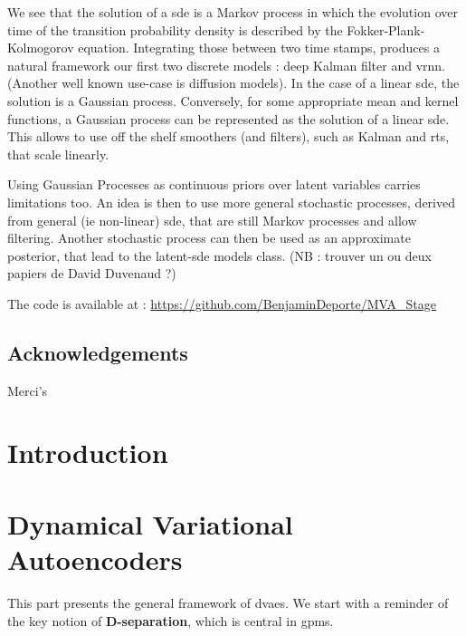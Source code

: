 \documentclass[twoside,11pt]{report}
\begin{document}
We see that the solution of a \gls{sde} is a Markov process in which the evolution over time of the transition probability density is described by the Fokker-Plank-Kolmogorov equation. Integrating those between two
time stamps, produces a natural framework our first two discrete models : deep Kalman filter and \gls{vrnn}. (Another well known 
use-case is diffusion models). In the case of a linear \gls{sde}, the solution is a Gaussian process. Conversely, for some appropriate mean and kernel functions, 
a Gaussian process can be represented as the solution of a linear \gls{sde}. This allows to use off the shelf smoothers (and filters), such as Kalman and \gls{rts}, that scale linearly.

Using Gaussian Processes as continuous priors over latent variables carries limitations too. An idea is then 
to use more general stochastic processes, derived from general (ie non-linear) \gls{sde}, that are still 
Markov processes and allow filtering. Another stochastic process can then be used as an approximate posterior, that 
lead to the \gls{latent-sde} models class. (NB : trouver un ou deux papiers de David Duvenaud ?)

The code is available at : \url{https://github.com/BenjaminDeporte/MVA_Stage}

\chapter*{Acknowledgements}

Merci's

\newpage
\singlespacing
\tableofcontents

\newpage
\listoffigures

\part{Introduction}
    
    
    
    

%
%
%
%
\part{Dynamical Variational Autoencoders}

This part presents the general framework of \glspl{dvae}. We start with a reminder of the key notion of \textbf{D-separation}, which is central in \glspl{gpm}.
\end{document}
